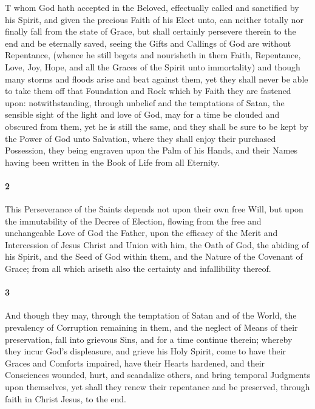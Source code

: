 \documentclass[
    paper=letterpaper,
    11pt,
    twoside,
    DIV=calc,
    openany
]{scrbook}
\makeatletter
\newcommand{\typo}[1]{}
\def\extractfirstletter#1#2@{#1}
\newcommand{\firstlettercommand}[1]{ \extractfirstletter#1@ }
\newcommand{\oldleadin}[2]{\lettrine[ante=\textbf{1},lines=2,lraise=0.1,findent=-0.3em,nindent=0.1em, slope=0em]{\color{red}\firstlettercommand{#2}}{\RemoveFirstLetter{#2}}}
\newcommand{\firstparagraph}{}
\makeatother
\begin{document}
\firstparagraph{} %
\oldleadin{THose}{Those} whom God hath accepted in the Beloved, effectually called and sanctified by his Spirit, and given the precious Faith of his Elect unto, can neither totally nor finally fall from the state of Grace, \R{}but shall certainly persevere therein to the end and be eternally saved, seeing the Gifts and Callings of God are without Repentance, (whence he still begets and nourisheth in them Faith, Repentance, Love, Joy, Hope, and all the Graces of the Spirit unto immortality) and though many storms and floods arise and beat against them, yet they shall never be able to take them off that Foundation and Rock which by Faith they are fastened upon: notwithstanding, through unbelief and the temptations of Satan, the sensible sight of the light and love of God, may for a time be clouded and obscured from \R{}them, yet he is still the same, \R{}and they shall be sure to be kept by the Power of God unto Salvation, where they shall enjoy their purchased Possession, they being engraven upon the Palm of his Hands, and their Names having been written in the Book of Life from all Eternity.

\footnotebegin
{}
\footnoteend

\paragraph{2} %
This Perseverance of the Saints depends not upon their own free Will, but upon the immutability of the Decree of \R{} Election, flowing from the free and unchangeable Love of God the Father, upon the efficacy of the Merit and Intercession of Jesus Christ \R{}and Union with him, the \R{}Oath of God, the abiding of his Spirit, and the \R{}Seed of God within them, and the Nature of the \R{}Covenant of Grace; from all which ariseth also the certainty and infallibility thereof. 

\footnotebegin
{}
\footnoteend

\paragraph{3} %
And though they may, through the temptation of Satan and of the World, the prevalency of Corruption remaining in them, and the neglect of Means of their preservation, fall into grievous \R{}Sins, and for a time continue therein; whereby they incur \R{}God’s displeasure, and grieve his \typo{holy Spirit}{Holy Spirit}, come to have their Graces and \R{}Comforts impaired, have their Hearts hardened, and their Consciences wounded, \R{}hurt, and scandalize others, and bring temporal Judgments \R{}upon themselves, yet shall they renew their \R{}repentance and be preserved, through faith in Christ Jesus, to the end.
\end{document}
